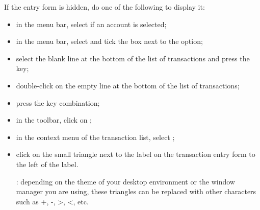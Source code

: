 \vspace{2mm}
If the entry form is hidden, do one of the following to display it:
\begin{itemize}
	\item in the menu bar, select  if an account is selected;
	\item in the menu bar, select  and tick the box next to the  option;
	\item select the blank line at the bottom of the list of transactions and press the  key;
	\item double-click on the empty line at the bottom of the list of transactions;
	\item press the  key combination;
	\item in the toolbar, click on ;
	\item in the context menu of the transaction list, select ;
	\item click on the small triangle next to the label  on the transaction entry form to the left of the label.
	
	\Note{}: depending on the theme of your desktop environment or the window manager you are using, these triangles can be replaced with other characters such as +, -, >, <, etc.
\end{itemize}
  
